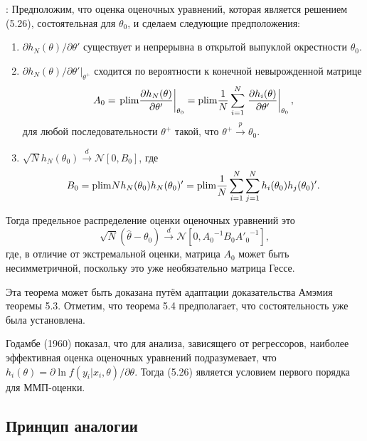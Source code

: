 \begin{theorem}:
Предположим, что оценка оценочных уравнений, которая является решением (5.26), состоятельная для $\theta_0$, и сделаем следующие предположения:
\begin{enumerate}
\item $\partial h_N(\theta)/ \partial \theta'$ существует и непрерывна в открытой выпуклой окрестности $\theta_0$. 
\item $\partial h_N(\theta)/ \partial \theta'|_{\theta^+}$ сходится по вероятности к конечной невырожденной матрице
\begin{equation}
A_0= \left. \mathrm{plim } \frac{\partial h_N(\theta)}{\partial \theta'} \right|_{\theta_0}=\mathrm{plim } \frac{1}{N} \sum_{i=1}^{N} \left. \frac{\partial h_i(\theta)}{\partial \theta'} \right|_{\theta_0},
\end{equation}
для любой последовательности $\theta^+$ такой, что $\theta^+ \xrightarrow{p} \theta_0$.
\item $\sqrt{N} h_N(\theta_0) \xrightarrow{d} \mathcal{N}[0,B_0]$, где
\begin{equation}
B_0= \mathrm{plim } N h_N(\theta_0) h_N(\theta_0)'=\mathrm{plim } \frac{1}{N} \sum_{i=1}^{N} \sum_{j=1}^{N} h_i(\theta_0) h_j(\theta_0)'.
\end{equation}
\end{enumerate}

Тогда предельное распределение оценки оценочных уравнений это
\begin{equation}
\sqrt{N}(\hat{\theta}-\theta_0) \xrightarrow{d} \mathcal{N}[0,{A_0}^{-1} B_0 {A'_0}^{-1}], 
\end{equation}
где, в отличие от экстремальной оценки, матрица $A_0$ может быть несимметричной, поскольку это уже необязательно матрица Гессе.
\end{theorem}

Эта теорема может быть доказана путём адаптации доказательства Амэмия теоремы 5.3. Отметим, что теорема 5.4 предполагает, что состоятельность уже была установлена.

Годамбе (1960) показал, что для анализа, зависящего от регрессоров, наиболее эффективная оценка оценочных уравнений подразумевает, что $h_i(\theta) = \partial \ln f(y_i|x_i, \theta)/ \partial \theta$. Тогда (5.26) является условием первого порядка для ММП-оценки.

\subsection{Принцип аналогии}


